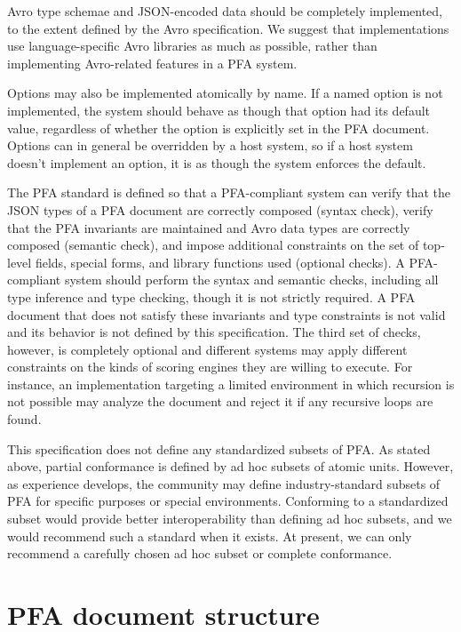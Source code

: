 \documentclass{article}
\theoremstyle{definition}
\begin{document}
Avro type schemae and JSON-encoded data should be completely implemented, to the extent defined by the Avro specification.  We suggest that implementations use language-specific Avro libraries as much as possible, rather than implementing Avro-related features in a PFA system.

Options may also be implemented atomically by name.  If a named option is not implemented, the system should behave as though that option had its default value, regardless of whether the option is explicitly set in the PFA document.  Options can in general be overridden by a host system, so if a host system doesn't implement an option, it is as though the system enforces the default.

The PFA standard is defined so that a PFA-compliant system can verify that the JSON types of a PFA document are correctly composed (syntax check), verify that the PFA invariants are maintained and Avro data types are correctly composed (semantic check), and impose additional constraints on the set of top-level fields, special forms, and library functions used (optional checks).  A PFA-compliant system should perform the syntax and semantic checks, including all type inference and type checking, though it is not strictly required.  A PFA document that does not satisfy these invariants and type constraints is not valid and its behavior is not defined by this specification.  The third set of checks, however, is completely optional and different systems may apply different constraints on the kinds of scoring engines they are willing to execute.  For instance, an implementation targeting a limited environment in which recursion is not possible may analyze the document and reject it if any recursive loops are found.

This specification does not define any standardized subsets of PFA.  As stated above, partial conformance is defined by ad hoc subsets of atomic units.  However, as experience develops, the community may define industry-standard subsets of PFA for specific purposes or special environments.  Conforming to a standardized subset would provide better interoperability than defining ad hoc subsets, and we would recommend such a standard when it exists.  At present, we can only recommend a carefully chosen ad hoc subset or complete conformance.

\pagebreak

\section{PFA document structure}
\end{document}
